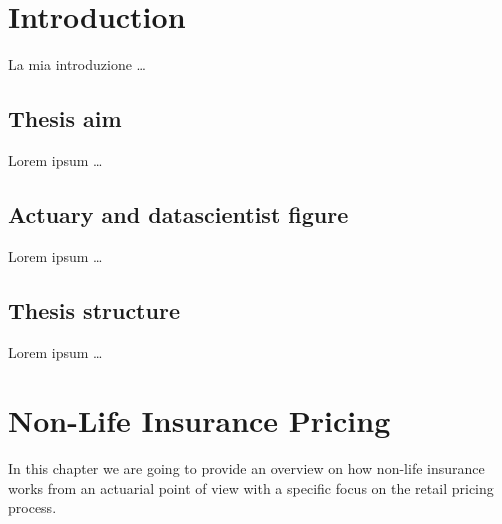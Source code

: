 \documentclass[a4paper, nobind]{templates/ociamthesis}
\theoremstyle{definition}
\theoremstyle{definition}
\theoremstyle{definition}
\theoremstyle{remark}
\begin{document}
\hypersetup{
    linkcolor=darkblue,
}

\flushbottom

\hypertarget{introduction}{%
\chapter*{Introduction}\label{introduction}}

\adjustmtc

La mia introduzione \ldots{}

\hypertarget{thesis-aim}{%
\section*{Thesis aim}\label{thesis-aim}}

Lorem ipsum \ldots{}

\hypertarget{actuary-and-datascientist-figure}{%
\section*{Actuary and datascientist figure}\label{actuary-and-datascientist-figure}}

Lorem ipsum \ldots{}

\hypertarget{thesis-structure}{%
\section*{Thesis structure}\label{thesis-structure}}

Lorem ipsum \ldots{}

\hypertarget{chap:nlip-ita-market}{%
\chapter{\texorpdfstring{\textbf{Non-Life Insurance Pricing}}{Non-Life Insurance Pricing}}\label{chap:nlip-ita-market}}

\minitoc  


In this chapter we are going to provide an overview on how non-life insurance works from an actuarial point of view with a specific focus on the retail pricing process.
\end{document}
